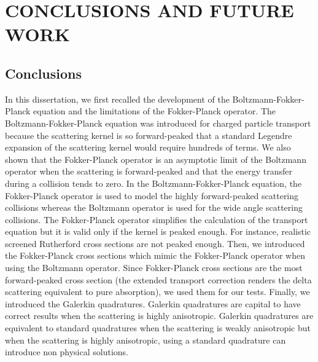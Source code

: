 \chapter{\uppercase{Conclusions and future work}}
\section{Conclusions}
In this dissertation, we first recalled the development of the
Boltzmann-Fokker-Planck equation and the limitations of the Fokker-Planck operator.
The Boltzmann-Fokker-Planck equation was introduced for charged particle transport
because the scattering kernel is so forward-peaked that a standard Legendre
expansion of the scattering kernel would require hundreds of terms. We also
shown that the Fokker-Planck operator is an asymptotic limit of the Boltzmann 
operator when the scattering is forward-peaked and that the energy transfer 
during a collision tends to zero. In the Boltzmann-Fokker-Planck equation, the 
Fokker-Planck operator is used to model 
the highly forward-peaked scattering collisions whereas the Boltzmann operator 
is used for the wide angle scattering collisions. The Fokker-Planck operator 
simplifies the calculation of the transport equation but it is valid only if 
the kernel is peaked enough. For instance, realistic screened Rutherford 
cross sections are not peaked enough. Then, we introduced the Fokker-Planck 
cross sections which mimic the Fokker-Planck operator when using the Boltzmann
operator. Since Fokker-Planck cross sections are the most forward-peaked cross
section (the extended transport correction renders the delta scattering equivalent 
to pure absorption), we used them for our tests. Finally, we introduced the Galerkin 
quadratures. Galerkin quadratures are capital to have correct results when 
the scattering is highly anisotropic. Galerkin quadratures are equivalent
to standard quadratures when the scattering is weakly anisotropic but when the
scattering is highly anisotropic, using a standard quadrature can introduce
non physical solutions.

